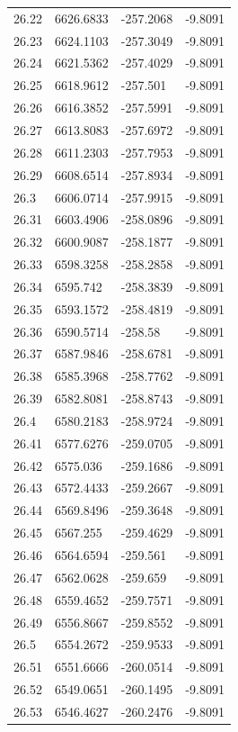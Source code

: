 \begin{table}[H]
\begin{tabular}{llll}
26.22 & 6626.6833 & -257.2068 & -9.8091 \\
26.23 & 6624.1103 & -257.3049 & -9.8091 \\
26.24 & 6621.5362 & -257.4029 & -9.8091 \\
26.25 & 6618.9612 & -257.501 & -9.8091 \\
26.26 & 6616.3852 & -257.5991 & -9.8091 \\
26.27 & 6613.8083 & -257.6972 & -9.8091 \\
26.28 & 6611.2303 & -257.7953 & -9.8091 \\
26.29 & 6608.6514 & -257.8934 & -9.8091 \\
26.3 & 6606.0714 & -257.9915 & -9.8091 \\
26.31 & 6603.4906 & -258.0896 & -9.8091 \\
26.32 & 6600.9087 & -258.1877 & -9.8091 \\
26.33 & 6598.3258 & -258.2858 & -9.8091 \\
26.34 & 6595.742 & -258.3839 & -9.8091 \\
26.35 & 6593.1572 & -258.4819 & -9.8091 \\
26.36 & 6590.5714 & -258.58 & -9.8091 \\
26.37 & 6587.9846 & -258.6781 & -9.8091 \\
26.38 & 6585.3968 & -258.7762 & -9.8091 \\
26.39 & 6582.8081 & -258.8743 & -9.8091 \\
26.4 & 6580.2183 & -258.9724 & -9.8091 \\
26.41 & 6577.6276 & -259.0705 & -9.8091 \\
26.42 & 6575.036 & -259.1686 & -9.8091 \\
26.43 & 6572.4433 & -259.2667 & -9.8091 \\
26.44 & 6569.8496 & -259.3648 & -9.8091 \\
26.45 & 6567.255 & -259.4629 & -9.8091 \\
26.46 & 6564.6594 & -259.561 & -9.8091 \\
26.47 & 6562.0628 & -259.659 & -9.8091 \\
26.48 & 6559.4652 & -259.7571 & -9.8091 \\
26.49 & 6556.8667 & -259.8552 & -9.8091 \\
26.5 & 6554.2672 & -259.9533 & -9.8091 \\
26.51 & 6551.6666 & -260.0514 & -9.8091 \\
26.52 & 6549.0651 & -260.1495 & -9.8091 \\
26.53 & 6546.4627 & -260.2476 & -9.8091 \\

\end{tabular}
\end{table}
